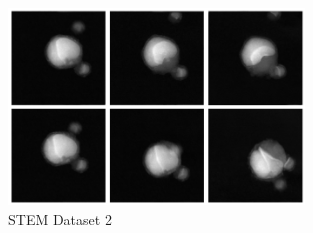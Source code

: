 \begin{itemize}
        \begin{figure}[H]
        \centering
        \includegraphics[width=0.7\textwidth]{img/STEM Dataset 2.png}
        \caption{STEM Dataset 2}\label{fig:STEM Dataset 2}
        \end{figure}
    
\end{itemize}
